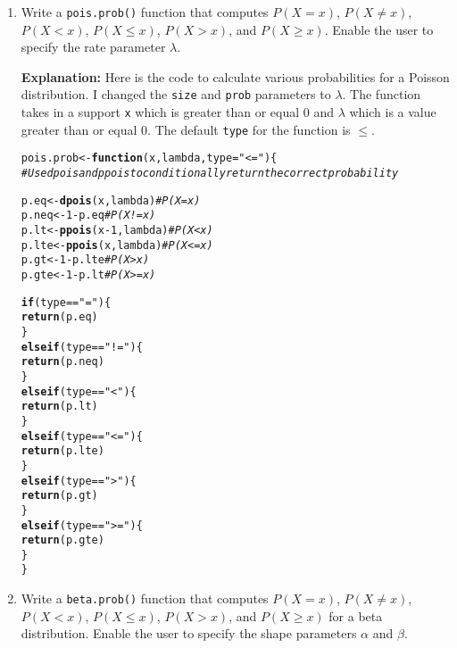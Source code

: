 \documentclass{article}\usepackage[]{graphicx}\usepackage[]{xcolor}
\makeatletter
\newcommand{\hlnum}[1]{\textcolor[rgb]{0.686,0.059,0.569}{#1}}%
\newcommand{\hlsng}[1]{\textcolor[rgb]{0.192,0.494,0.8}{#1}}%
\newcommand{\hlcom}[1]{\textcolor[rgb]{0.678,0.584,0.686}{\textit{#1}}}%
\newcommand{\hlopt}[1]{\textcolor[rgb]{0,0,0}{#1}}%
\newcommand{\hldef}[1]{\textcolor[rgb]{0.345,0.345,0.345}{#1}}%
\newcommand{\hlkwa}[1]{\textcolor[rgb]{0.161,0.373,0.58}{\textbf{#1}}}%
\newcommand{\hlkwb}[1]{\textcolor[rgb]{0.69,0.353,0.396}{#1}}%
\newcommand{\hlkwc}[1]{\textcolor[rgb]{0.333,0.667,0.333}{#1}}%
\newcommand{\hlkwd}[1]{\textcolor[rgb]{0.737,0.353,0.396}{\textbf{#1}}}%
\newenvironment{kframe}{%
 \def\at@end@of@kframe{}%
 \ifinner\ifhmode%
  \def\at@end@of@kframe{\end{minipage}}%
  \begin{minipage}{\columnwidth}%
 \fi\fi%
 \def\FrameCommand##1{\hskip\@totalleftmargin \hskip-\fboxsep
 \colorbox{shadecolor}{##1}\hskip-\fboxsep
     \hskip-\linewidth \hskip-\@totalleftmargin \hskip\columnwidth}%
 \MakeFramed {\advance\hsize-\width
   \@totalleftmargin\z@ \linewidth\hsize
   \@setminipage}}%
 {\par\unskip\endMakeFramed%
 \at@end@of@kframe}
\newenvironment{knitrout}{}{} %
\makeatother
\begin{document}
\begin{enumerate}
\item Write a \texttt{pois.prob()} function that computes $P(X=x)$, $P(X \neq x)$, $P(X<x)$, $P(X \leq x)$, $P(X > x)$, and $P(X \geq x).$ Enable the user to specify the rate parameter $\lambda$.

\textbf{Explanation:} Here is the code to calculate various probabilities for a Poisson distribution. I changed the \texttt{size} and \texttt{prob} parameters to \texttt{$\lambda$}. The function takes in a support \texttt{x} which is greater than or equal 0 and \texttt{$\lambda$} which is a value greater than or equal 0. The default \texttt{type} for the function is $\leq$.
\begin{knitrout}\scriptsize
{}\color{fgcolor}\begin{kframe}
\begin{alltt}
\hldef{pois.prob} \hlkwb{<-} \hlkwa{function}\hldef{(}\hlkwc{x}\hldef{,} \hlkwc{lambda}\hldef{,} \hlkwc{type}\hldef{=}\hlsng{"<="}\hldef{)\{}
  \hlcom{# Use dpois and ppois to conditionally return the correct probability}

  \hldef{p.eq} \hlkwb{<-} \hlkwd{dpois}\hldef{(x, lambda)}     \hlcom{# P(X = x)}
  \hldef{p.neq} \hlkwb{<-} \hlnum{1} \hlopt{-} \hldef{p.eq}            \hlcom{# P(X != x)}
  \hldef{p.lt} \hlkwb{<-} \hlkwd{ppois}\hldef{(x} \hlopt{-} \hlnum{1}\hldef{, lambda)} \hlcom{# P(X < x)}
  \hldef{p.lte} \hlkwb{<-} \hlkwd{ppois}\hldef{(x, lambda)}    \hlcom{# P(X <= x)}
  \hldef{p.gt}  \hlkwb{<-} \hlnum{1} \hlopt{-} \hldef{p.lte}           \hlcom{# P(X > x)}
  \hldef{p.gte}  \hlkwb{<-} \hlnum{1} \hlopt{-} \hldef{p.lt}           \hlcom{# P(X >= x)}

  \hlkwa{if} \hldef{(type} \hlopt{==} \hlsng{"="}\hldef{) \{}
    \hlkwd{return}\hldef{(p.eq)}
  \hldef{\}}
  \hlkwa{else if} \hldef{(type} \hlopt{==} \hlsng{"!="}\hldef{) \{}
    \hlkwd{return}\hldef{(p.neq)}
  \hldef{\}}
  \hlkwa{else if} \hldef{(type} \hlopt{==} \hlsng{"<"}\hldef{) \{}
    \hlkwd{return}\hldef{(p.lt)}
  \hldef{\}}
  \hlkwa{else if} \hldef{(type} \hlopt{==} \hlsng{"<="}\hldef{) \{}
    \hlkwd{return}\hldef{(p.lte)}
  \hldef{\}}
  \hlkwa{else if} \hldef{(type} \hlopt{==} \hlsng{">"}\hldef{) \{}
    \hlkwd{return}\hldef{(p.gt)}
  \hldef{\}}
  \hlkwa{else if} \hldef{(type} \hlopt{==} \hlsng{">="}\hldef{) \{}
    \hlkwd{return}\hldef{(p.gte)}
  \hldef{\}}
\hldef{\}}
\end{alltt}
\end{kframe}
\end{knitrout}
\item Write a \texttt{beta.prob()} function that computes $P(X=x)$, 
$P(X \neq x)$, $P(X<x)$, $P(X \leq x)$, $P(X > x)$, and $P(X \geq x)$
for a beta distribution. Enable the user to specify the shape parameters
$\alpha$ and $\beta$.


\end{enumerate}
\end{document}
